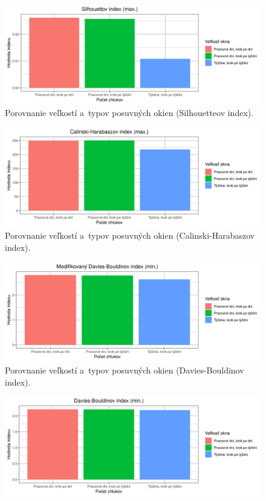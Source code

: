\documentclass[a4paper,twoside,slovak,12pt,appendix]{article}
\begin{document}
\begin{appendices}
\begin{figure}[htbp]
  \centering
  \includegraphics[width=\textwidth]{cvi/window_comparison/201904291100-Sil-window_comparison.png}
  \caption{Porovnanie veľkostí a~typov posuvných okien (Silhouetteov index).}
\end{figure}
\begin{figure}[htbp]
  \centering
  \includegraphics[width=\textwidth]{cvi/window_comparison/201904291100-CH-window_comparison.png}
  \caption{Porovnanie veľkostí a~typov posuvných okien (Calinski-Harabaszov index).}
\end{figure}
\begin{figure}[htbp]
  \centering
  \includegraphics[width=\textwidth]{cvi/window_comparison/201904291100-DBstar-window_comparison.png}
  \caption{Porovnanie veľkostí a~typov posuvných okien (Davies-Bouldinov index).}
\end{figure}
\begin{figure}[htbp]
  \centering
  \includegraphics[width=\textwidth]{cvi/window_comparison/201904291100-DB-window_comparison.png}

\end{figure}
\end{appendices}
\end{document}
